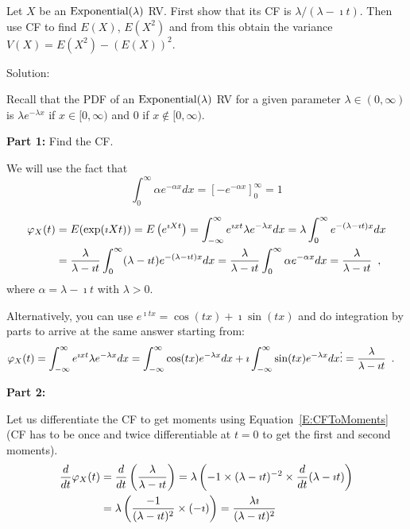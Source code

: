 \begin{example}\label{EgCFOfExponential}
Let $X$ be an $\mbox{{\rm Exponential}}(\lambda)$ RV. 
First show that its CF is $\lambda/(\lambda- \imath t)$.  
Then use CF to find $E(X)$, $E(X^2)$ and from this obtain the variance $V(X) = E(X^2)-(E(X))^2$.

Solution:

Recall that the PDF of an $\mbox{{\rm Exponential}}(\lambda)$ RV for a given parameter $\lambda \in (0,\infty)$ is $\lambda e^{-\lambda x}$ if $x \in [0, \infty)$ and $0$ if $x \notin [0, \infty)$.

{\bf Part 1:} Find the CF.

We will use the fact that 
$$\int_0^{\infty} \alpha e^{-\alpha x} dx = \left[ -e^{-\alpha x} \right]_0^{\infty} = 1$$

\begin{align*}
\varphi_X(t)
&= E(\exp(\imath X t))
= E\left( e^{\imath X t} \right)
= \int_{-\infty}^{\infty} e^{\imath x t} \lambda e^{-\lambda x} dx
= \lambda  \int_{0}^{\infty} e^{-(\lambda-\imath t) x} dx\\
&= \frac{\lambda}{\lambda-\imath t}  \int_{0}^{\infty} (\lambda-\imath t) e^{-(\lambda-\imath t) x} dx
= \frac{\lambda}{\lambda-\imath t}  \int_{0}^{\infty} \alpha e^{-\alpha x} dx
= \frac{\lambda}{\lambda-\imath t} \enspace, 
\end{align*}
where $\alpha = \lambda-\imath t$ with $\lambda > 0$.

Alternatively, you can use $e^{\imath t x} = \cos(tx)+\imath \sin(tx)$ and do integration by parts to arrive at the same answer starting from:
\begin{align*}
\varphi_X(t)
&= \int_{-\infty}^{\infty} e^{\imath x t} \lambda e^{-\lambda x} dx
= \int_{-\infty}^{\infty} \cos(t x) e^{-\lambda x} dx + \imath \int_{-\infty}^{\infty} \sin(t x) e^{-\lambda x} dx
\vdots 
= \frac{\lambda}{\lambda-\imath t} \enspace .
\end{align*}

{\bf Part 2:}

Let us differentiate the CF to get moments using Equation~\eqref{E:CFToMoments} (CF has to be once and twice differentiable at $t=0$ to get the first and second moments).
\begin{align*}
\frac{d}{dt}\varphi_X(t)
&= \frac{d}{dt}\left( \frac{\lambda}{\lambda-\imath t} \right) 
= \lambda \left( -1 \times (\lambda-\imath t)^{-2} \times \frac{d}{dt} (\lambda-\imath t) \right) \\
&= \lambda \left( \frac{-1}{(\lambda-\imath t)^{2}} \times (-\imath ) \right) 
= \frac{\lambda \imath}{(\lambda-\imath t)^{2}} 
\end{align*}


\end{example}
